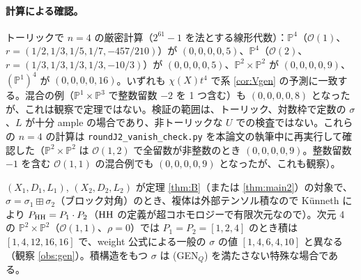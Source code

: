 \paragraph{計算による確認\tV。}トーリックで $n=4$ の厳密計算（$2^{61}-1$ を法とする線形代数）：$\mathbb P^4$（$\mathcal O(1)$、$r=(1/2,1/3,1/5,1/7,-457/210)$）が $(0,0,0,0,5)$、$\mathbb P^4$（$\mathcal O(2)$、$r=(1/3,1/3,1/3,1/3,-10/3)$）が $(0,0,0,0,5)$、$\mathbb P^2\times\mathbb P^2$ が $(0,0,0,0,9)$、$(\mathbb P^1)^4$ が $(0,0,0,0,16)$。いずれも $\chi(X)t^4$ で系 \ref{cor:Vgen} の予測に一致する。混合の例（$\mathbb P^1\times\mathbb P^3$ で整数留数 $-2$ を 1 つ含む）も $(0,0,0,0,8)$ となったが、これは観察で定理ではない。検証の範囲は、トーリック、対数枠で定数の $\sigma$、$L$ が十分 ample の場合であり、非トーリックな $U$ での検査ではない。これらの $n=4$ の計算は \texttt{roundJ2\_vanish\_check.py} を本論文の執筆中に再実行して確認した（$\mathbb P^2\times\mathbb P^2$ は $\mathcal O(1,2)$ で全留数が非整数のとき $(0,0,0,0,9)$。整数留数 $-1$ を含む $\mathcal O(1,1)$ の混合例でも $(0,0,0,0,9)$ となったが、これも観察）。

\begin{ex}[積\ \tP\ \tV]\label{ex:prod}
$(X_1,D_1,L_1)$, $(X_2,D_2,L_2)$ が定理 \ref{thm:B}（または \ref{thm:main2}）の対象で、$\sigma=\sigma_1\boxplus\sigma_2$（ブロック対角）のとき、複体は外部テンソル積なので Künneth により $P_{\mathrm{HH}}=P_1\cdot P_2$（$\mathrm{HH}$ の定義が超コホモロジーで有限次元なので）。次元 4 の $\mathbb P^2\times\mathbb P^2$（$\mathcal O(1,1)$、$\rho=0$）では $P_1=P_2=[1,2,4]$ のとき積は $[1,4,12,16,16]$ で、weight 公式による一般の $\sigma$ の値 $[1,4,6,4,10]$ と異なる（観察 \ref{obs:gen}）。積構造をもつ $\sigma$ は (GEN$_Q$) を満たさない特殊な場合である。
\end{ex}
